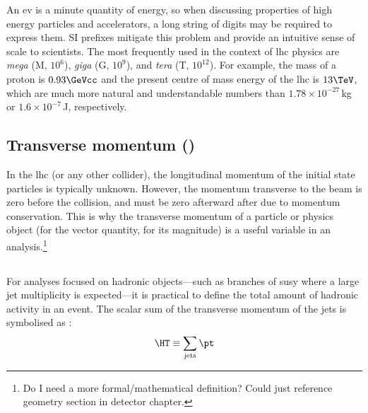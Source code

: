 An \acrlong{ev} is a minute quantity of energy, so when discussing properties of high energy particles and accelerators, a long string of digits may be required to express them. SI prefixes mitigate this problem and provide an intuitive sense of scale to scientists. The most frequently used in the context of \acrshort{lhc} physics are \emph{mega} (M, $\text{10}^6$), \emph{giga} (G, $\text{10}^9$), and \emph{tera} (T, $\text{10}^{12}$). For example, the mass of a proton is $\text{0.93}\GeVcc$ and the present centre of mass energy of the \acrshort{lhc} is $\text{13}\TeV$, which are much more natural and understandable numbers than $\text{1.78}\times \text{10}^{-27}$\,kg or $\text{1.6}\times \text{10}^{-7}$\,J, respectively.




\subsection{Transverse momentum (\texorpdfstring{\ptvec}{pt})}
\label{subsec:objects_pt}

In the \acrshort{lhc} (or any other collider), the longitudinal momentum of the initial state particles is typically unknown. However, the momentum transverse to the beam is zero before the collision, and must be zero afterward after due to momentum conservation. This is why the transverse momentum of a particle or physics object (\ptvec for the vector quantity, \pt for its magnitude) is a useful variable in an analysis.\footnote{Do I need a more formal/mathematical definition? Could just reference geometry section in detector chapter.}




\subsection{\texorpdfstring{\HT}{HT}}
\label{subsec:objects_ht}

For analyses focused on hadronic objects---such as branches of \acrlong{susy} where a large \gls{jet} multiplicity is expected---it is practical to define the total amount of hadronic activity in an event. The scalar sum of the transverse momentum of the \glspl{jet} is symbolised as \HT:
\begin{equation}
    \HT \equiv \sum_{\mathrm{jets}} \pt
    \label{eq:ht_definition}
\end{equation}

